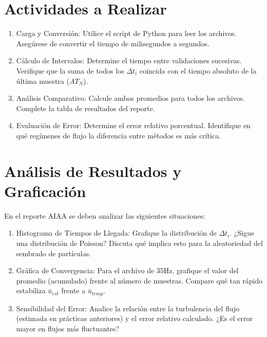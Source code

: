 \documentclass[11pt, a4paper]{article}
\begin{document}
\section{Actividades a Realizar}
\begin{enumerate}
    \item Carga y Conversión: Utilice el script de Python para leer los archivos. Asegúrese de convertir el tiempo de milisegundos a segundos.
    \item Cálculo de Intervalos: Determine el tiempo entre validaciones sucesivas. Verifique que la suma de todos los $\Delta t_i$ coincida con el tiempo absoluto de la última muestra ($AT_N$).
    \item Análisis Comparativo: Calcule ambos promedios para todos los archivos. Complete la tabla de resultados del reporte.
    \item Evaluación de Error: Determine el error relativo porcentual. Identifique en qué regímenes de flujo la diferencia entre métodos es más crítica.
\end{enumerate}

\section{Análisis de Resultados y Graficación}
En el reporte AIAA se deben analizar las siguientes situaciones:
\begin{enumerate}
    \item Histograma de Tiempos de Llegada: Grafique la distribución de $\Delta t_i$. ¿Sigue una distribución de Poisson? Discuta qué implica esto para la aleatoriedad del sembrado de partículas.
    \item Gráfica de Convergencia: Para el archivo de 35Hz, grafique el valor del promedio (acumulado) frente al número de muestras. Compare qué tan rápido estabiliza $\bar{u}_{est}$ frente a $\bar{u}_{temp}$.
    \item Sensibilidad del Error: Analice la relación entre la turbulencia del flujo (estimada en prácticas anteriores) y el error relativo calculado. ¿Es el error mayor en flujos más fluctuantes?
\end{enumerate}
\end{document}
